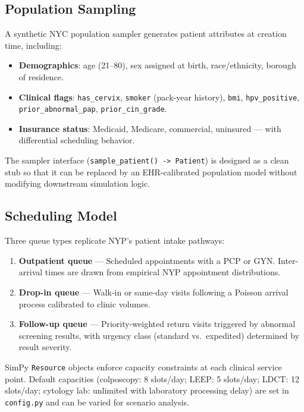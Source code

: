 \documentclass[12pt]{article}
\begin{document}
\subsection{Population Sampling}

A synthetic NYC population sampler generates patient attributes at
creation time, including:
\begin{itemize}[leftmargin=2em]
  \item \textbf{Demographics}: age (21--80), sex assigned at birth,
        race/ethnicity, borough of residence.
  \item \textbf{Clinical flags}: \texttt{has\_cervix},
        \texttt{smoker} (pack-year history), \texttt{bmi},
        \texttt{hpv\_positive}, \texttt{prior\_abnormal\_pap},
        \texttt{prior\_cin\_grade}.
  \item \textbf{Insurance status}: Medicaid, Medicare, commercial,
        uninsured — with differential scheduling behavior.
\end{itemize}
The sampler interface (\texttt{sample\_patient() -> Patient}) is designed
as a clean stub so that it can be replaced by an EHR-calibrated
population model without modifying downstream simulation logic.

\subsection{Scheduling Model}

Three queue types replicate NYP's patient intake pathways:

\begin{enumerate}[leftmargin=2em]
  \item \textbf{Outpatient queue} — Scheduled appointments with a PCP or
        GYN.  Inter-arrival times are drawn from empirical NYP appointment
        distributions.
  \item \textbf{Drop-in queue} — Walk-in or same-day visits following a
        Poisson arrival process calibrated to clinic volumes.
  \item \textbf{Follow-up queue} — Priority-weighted return visits
        triggered by abnormal screening results, with urgency class
        (standard vs.\ expedited) determined by result severity.
\end{enumerate}

SimPy \texttt{Resource} objects enforce capacity constraints at each
clinical service point.
Default capacities (colposcopy: 8 slots/day; LEEP: 5 slots/day;
LDCT: 12 slots/day; cytology lab: unlimited with laboratory processing
delay) are set in \texttt{config.py} and can be varied for scenario
analysis.
\end{document}
